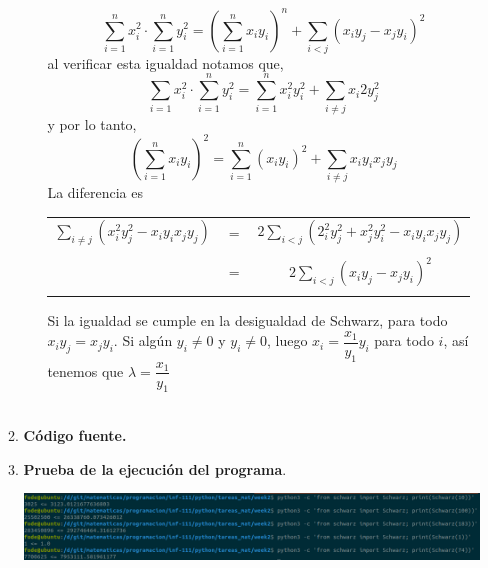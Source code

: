 \begin{enumerate}
\begin{enumerate}[\bfseries a)]
\begin{enumerate}[\bfseries i)]
            $$\sum\limits_{i=1}^n x_i^2 \cdot \sum\limits_{i=1}^n y_i^2 = \left( \sum\limits_{i=1}^n x_iy_i \right)^n + \sum\limits_{i<j} (x_i y_j -x_j y_i)^2$$
            al verificar esta igualdad notamos que,
            $$\sum\limits_{i=1}x_i^2 \cdot \sum\limits_{i=1}^n y_i^2 = \sum\limits_{i=1}^n x_i^2 y_i^2 + \sum\limits_{i\neq j} x_i2 y_j^2$$
             y por lo tanto,
             $$\left( \sum\limits_{i=1}^n x_i y_i \right)^2 = \sum\limits_{i=1}^n (x_i y_i)^2 + \sum\limits_{i\neq j} x_i y_i x_j y_j$$
             La diferencia es
             \begin{center} 
                \begin{tabular}{rlc}
                   $\sum\limits_{i \neq j} (x_i^2 y_j^2 - x_i y_i x_j y_j)$ & $=$ & $2 \sum\limits_{i<j} (2_i^2 y_j^2 + x_j^2 y_i^2 - x_i y_i x_j y_j)$\\\\
                      & $=$ & $2 \sum\limits_{i<j} (x_i y_j - x_j y_i)^2$\\\\
                \end{tabular}
             \end{center}
             Si la igualdad se cumple en la desigualdad de Schwarz, para todo $x_iy_j = x_j y_i$. Si algún $y_i \neq 0$ y $y_i \neq 0$, luego $x_i=\dfrac{x_1}{y_1}y_i$ para todo $i$, así tenemos que $\lambda = \dfrac{x_1}{y_1}$\\\\
      \end{enumerate} 

	\item \textbf{Código fuente.}\\ 
	    
	    
	    \vspace{1cm}
	
	\item \textbf{Prueba de la ejecución del programa}.\\
	    \begin{center}
		\includegraphics[scale=.35]{imagenes/tareas_mat/week2/schwarz.png}
	    \end{center}

    \end{enumerate}

\newpage



\end{enumerate}
